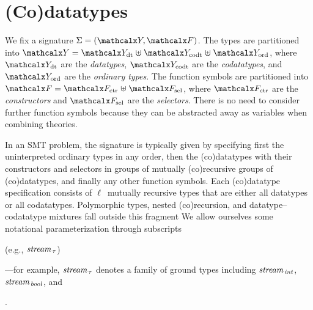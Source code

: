 
\section{%
(Co)datatypes}
\label{sec:the-theory-of-co-datatypes}


We fix a signature $\Sig = (\Types, \Funcs)$. The types are partitioned into
$\Types = \Data \mathrel{\uplus} \Codata \mathrel{\uplus} \Nondata$, where $\Data$ are the
\emph{datatypes}, $\Codata$ are the \emph{codatatypes}, and $\Nondata$ are the %
\emph{ordinary types}. The function symbols are partitioned into $\Funcs = \Ctr
\mathrel{\uplus} \Sel$, where $\Ctr$ are the \emph{constructors} and $\Sel$ are the
\emph{selectors}. There is no need to consider further function symbols
because they can be abstracted away as variables when combining theories.

In an SMT problem, the signature is typically given by specifying first the
uninterpreted ordinary types in any order, then the (co)datatypes with their constructors
and selectors in groups of mutually (co)recursive groups of (co)datatypes, and
finally any other function symbols.
%
Each (co)datatype specification consists of $\ell$~mutually recursive types that are
either all datatypes or all codatatypes. Polymorphic types, nested
(co)recursion, and datatype--codatatype mixtures fall outside this fragment%
We allow ourselves some notational parameterization
through subscripts%
\begin{conf}
(e.g., $\textit{stream}_{\,\tau}$)%
\end{conf}%
\begin{rep}---for example, $\textit{stream}_{\,\tau}$ denotes a
family of ground types including
$\textit{stream}_{\,\textit{int}}$, $\textit{stream}_{\,\textit{bool}}$,
and \end{rep}.

